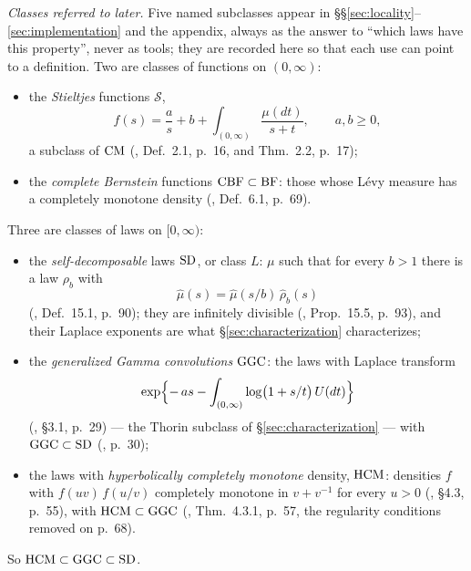 \emph{Classes referred to later.} Five named subclasses appear in
\S\S\ref{sec:locality}--\ref{sec:implementation} and the appendix, always as the answer to
``which laws have this property'', never as tools; they are recorded here so that each use
can point to a definition. Two are classes of functions on $(0,\infty)$:
\begin{itemize}
\item the \emph{Stieltjes} functions $\mathcal{S}$,
  \[
    f(s) = \frac{a}{s} + b + \int_{(0,\infty)} \frac{\mu(dt)}{s+t}, \qquad a, b \ge 0,
  \]
  a subclass of $\mathrm{CM}$ (, Def.~2.1, p.~16, and Thm.~2.2,
  p.~17);
\item the \emph{complete Bernstein} functions $\mathrm{CBF} \subset \mathrm{BF}$: those whose Lévy measure
  has a completely monotone density (, Def.~6.1, p.~69).
\end{itemize}
Three are classes of laws on $[0,\infty)$:
\begin{itemize}
\item the \emph{self-decomposable} laws $\mathrm{SD}$, or class $L$: $\mu$ such that for
  every $b > 1$ there is a law $\rho_b$ with
  \[
    \hat\mu(s) = \hat\mu(s/b)\,\hat\rho_b(s)
  \]
  (, Def.~15.1, p.~90); they are infinitely divisible
  (, Prop.~15.5, p.~93), and their Laplace exponents are what
  \S\ref{sec:characterization} characterizes;
\item the \emph{generalized Gamma convolutions} $\mathrm{GGC}$: the laws with Laplace transform
  \[
    \exp\Bigl\{-\,a s - \int_{(0,\infty)} \log\bigl(1 + s/t\bigr)\,U(dt)\Bigr\}
  \]
  (, \S3.1, p.~29) --- the Thorin subclass of
  \S\ref{sec:characterization} --- with $\mathrm{GGC} \subset \mathrm{SD}$
  (, p.~30);
\item the laws with \emph{hyperbolically completely monotone} density, $\mathrm{HCM}$: densities
  $f$ with $f(uv)\,f(u/v)$ completely monotone in $v + v^{-1}$ for every $u > 0$
  (, \S4.3, p.~55), with $\mathrm{HCM} \subset \mathrm{GGC}$
  (, Thm.~4.3.1, p.~57, the regularity conditions removed
  on p.~68).
\end{itemize}
So $\mathrm{HCM} \subset \mathrm{GGC} \subset \mathrm{SD}$.

